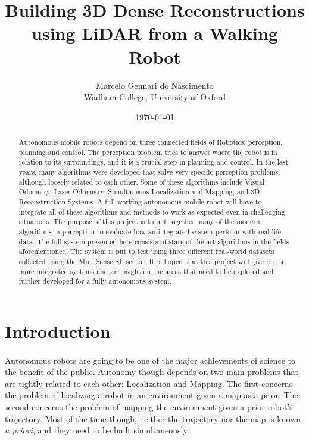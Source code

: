 \documentclass[12pt]{article}
\title{Building 3D Dense Reconstructions using LiDAR from a Walking Robot}
\author{Marcelo Gennari do Nascimento \\ Wadham College, University of Oxford}
\date{\today}
\begin{document}

	\maketitle

	\newpage

	\begin{abstract}
		Autonomous mobile robots depend on three connected fields of Robotics: perception, planning and control. The perception problem tries to answer where the robot is in relation to its surroundings, and it is a crucial step in planning and control.
		In the last years, many algorithms were developed that solve very specific perception problems, although loosely related to each other. Some of these algorithms include Visual Odometry, Laser Odometry, Simultaneous Localization and Mapping, and 3D Reconstruction Systems.
		A full working autonomous mobile robot will have to integrate all of these algorithms and methods to work as expected even in challenging situations.
		The purpose of this project is to put together many of the modern algorithms in perception to evaluate how an integrated system perform with real-life data. The full system presented here consists of state-of-the-art algorithms in the fields aforementioned. The system is put to test using three different real-world datasets collected using the MultiSense SL sensor.
		It is hoped that this project will give rise to more integrated systems and an insight on the areas that need to be explored and further developed for a fully autonomous system.
	\end{abstract}

	\newpage
	\tableofcontents

	\newpage
	\section{Introduction}
	\paragraph{}
	Autonomous robots are going to be one of the major achievements of science to the benefit of the public. Autonomy though depends on two main problems that are tightly related to each other: Localization and Mapping. The first concerns the problem of localizing a robot in an environment given a map as a prior. The second concerns the problem of mapping the environment given a prior robot's trajectory. Most of the time though, neither the trajectory nor the map is known \textit{a priori}, and they need to be built simultaneously.
	
\end{document}
